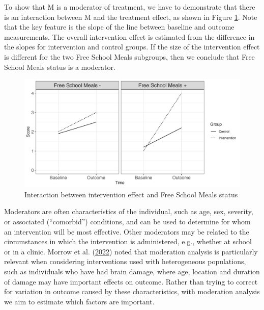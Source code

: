 \documentclass{krantz}
\begin{document}
To show that M is a moderator of treatment, we have to demonstrate that there is an interaction between M and the treatment effect, as shown in Figure \ref{fig:modfig}. Note that the key feature is the slope of the line between baseline and outcome measurements. The overall intervention effect is estimated from the difference in the slopes for intervention and control groups. If the size of the intervention effect is different for the two Free School Meals subgroups, then we conclude that Free School Meals status is a moderator.

\begin{center}
\begin{figure}
\includegraphics[width=0.95\linewidth]{images_bw/Moderator} \caption{Interaction between intervention effect and Free School Meals status}\label{fig:modfig}
\end{figure}
\end{center}

Moderators are often characteristics of the individual, such as age, sex, severity, or associated (``comorbid'') conditions, and can be used to determine for whom an intervention will be most effective. Other moderators may be related to the circumstances in which the intervention is administered, e.g., whether at school or in a clinic. Morrow et al. (\protect\hyperlink{ref-morrow2022}{2022}) noted that moderation analysis is particularly relevant when considering interventions used with heterogeneous populations, such as individuals who have had brain damage, where age, location and duration of damage may have important effects on outcome. Rather than trying to correct for variation in outcome caused by these characteristics, with moderation analysis we aim to estimate which factors are important.
\end{document}
